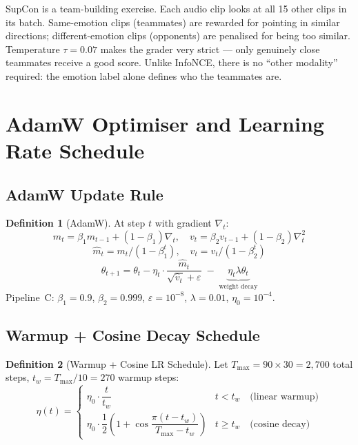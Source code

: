 \documentclass[12pt,a4paper]{article}
\theoremstyle{definition}
\newtheorem{definition}{Definition}[section]
\theoremstyle{plain}
\theoremstyle{remark}
\begin{document}
\begin{tcolorbox}[layman]
SupCon is a team-building exercise.  Each audio clip looks at all 15 other clips
in its batch.  Same-emotion clips (teammates) are rewarded for pointing in similar
directions; different-emotion clips (opponents) are penalised for being too similar.
Temperature $\tau=0.07$ makes the grader very strict --- only genuinely close
teammates receive a good score.  Unlike InfoNCE, there is no ``other modality''
required: the emotion label alone defines who the teammates are.
\end{tcolorbox}

\section{AdamW Optimiser and Learning Rate Schedule}

\subsection{AdamW Update Rule}

\begin{definition}[AdamW]
At step $t$ with gradient $\nabla_t$:
\[
  m_t = \beta_1 m_{t-1}+(1-\beta_1)\nabla_t, \quad
  v_t = \beta_2 v_{t-1}+(1-\beta_2)\nabla_t^2
\]
\[
  \hat{m}_t = m_t/(1-\beta_1^t), \quad \hat{v}_t = v_t/(1-\beta_2^t)
\]
\[
  \theta_{t+1} = \theta_t
  - \eta_t\cdot\frac{\hat{m}_t}{\sqrt{\hat{v}_t}+\varepsilon}
  \;-\; \underbrace{\eta_t\lambda\theta_t}_{\text{weight decay}}
\]
Pipeline~C: $\beta_1{=}0.9$, $\beta_2{=}0.999$, $\varepsilon{=}10^{-8}$,
$\lambda{=}0.01$, $\eta_0{=}10^{-4}$.
\end{definition}

\subsection{Warmup + Cosine Decay Schedule}

\begin{definition}[Warmup + Cosine LR Schedule]
Let $T_{\max} = 90 \times 30 = 2{,}700$ total steps, $t_w = T_{\max}/10 = 270$
warmup steps:
\[
  \eta(t) = \begin{cases}
  \eta_0 \cdot \dfrac{t}{t_w} & t < t_w \quad\text{(linear warmup)}\\[6pt]
  \eta_0 \cdot \dfrac{1}{2}\!\left(1+\cos\dfrac{\pi(t-t_w)}{T_{\max}-t_w}\right) & t\geq t_w \quad\text{(cosine decay)}
  \end{cases}
\]
\end{definition}
\end{document}
